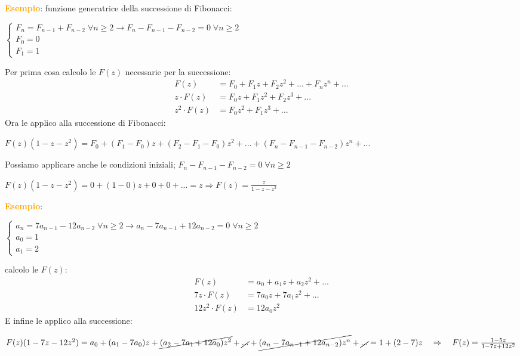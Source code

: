 \begin{flushleft}
    \textcolor{orange}{\textbf{Esempio}}: funzione generatrice della successione di Fibonacci:

    {\centering
        $\begin{cases}
            F_n = F_{n-1} + F_{n-2} \; \forall n \geq 2 \rightarrow F_n - F_{n-1} - F_{n-2} = 0 \; \forall n \geq 2 \\
            F_0 = 0 \\
            F_1 = 1
        \end{cases}$
    \par}

    Per prima cosa calcolo le $F(z)$ necessarie per la successione:
    \begin{align*}
        F(z) &= F_0 + F_1z + F_2z^2 + ... + F_nz^n + ... \\
        z \cdot F(z) &= F_0z + F_1z^2 + F_2z^3 + ... \\
        z^2 \cdot F(z) &= F_0z^2 + F_1z^3 + ...
    \end{align*}
    Ora le applico alla successione di Fibonacci:

    {\centering
        $F(z)(1-z-z^2) = F_0 + (F_1 - F_0)z + (F_2 - F_1 - F_0)z^2 + ... + (F_n - F_{n-1} - F_{n-2})z^n + ...$
    \par}

    Possiamo applicare anche le condizioni iniziali; $F_n - F_{n-1} - F_{n-2} = 0 \; \forall n \geq 2$

    {\centering
        $F(z)(1-z-z^2) = 0 + (1-0)z + 0 + 0 + ... = z \Rightarrow F(z) = \frac{z}{1-z-z^2}$
    \par}

    \textcolor{orange}{\textbf{Esempio}}:

    {\centering
        $\begin{cases}
            a_n = 7a_{n-1} - 12a_{n-2} \; \forall n \geq 2 \rightarrow a_n - 7a_{n-1} + 12a_{n-2} = 0 \; \forall n \geq 2 \\
            a_0 = 1 \\
            a_1 = 2 
        \end{cases}$
    \par}
    calcolo le $F(z)$:
    \begin{align*}
        F(z) &= a_0 + a_1z + a_2z^2 + ... \\
        7z\cdot F(z) &=  7a_0z + 7a_1z^2 + ... \\
        12z^2 \cdot F(z) &= 12a_0z^2
    \end{align*}
    E infine le applico alla successione:

    {\centering
        $F(z)(1 - 7z -12z^2) = a_0 + (a_1 - 7a_0)z + \cancel{(a_2 - 7a_1 + 12a_0)z^2} + \cancel{...} + \cancel{(a_n - 7a_{n-1} + 12a_{n-2})z^n} + \cancel{...} = 1 + (2-7)z \quad \Rightarrow \quad F(z) = \frac{1-5z}{1-7z+12z^2}$
    \par}
\end{flushleft}

